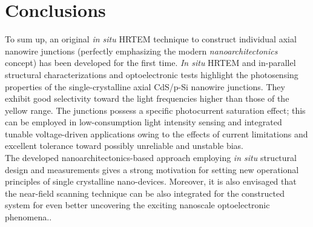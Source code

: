 \section{Conclusions}
To sum up, an original {\em in situ} HRTEM technique to construct individual axial nanowire junctions (perfectly emphasizing the modern {\em nanoarchitectonics} concept) has been developed for the first time. 
{\em In situ} HRTEM and in-parallel structural characterizations and optoelectronic tests highlight the photosensing properties of the single-crystalline axial CdS/p-Si nanowire junctions. They exhibit good selectivity toward the light frequencies higher than those of the yellow range. The junctions possess a specific photocurrent saturation effect; this can be employed in low-consumption light intensity sensing and integrated tunable voltage-driven applications owing to the effects of current limitations and excellent tolerance toward possibly unreliable and unstable bias. \\
The developed nanoarchitectonics-based approach employing \textit{in situ} structural design and measurements gives a strong motivation for setting new operational principles of single crystalline nano-devices. 
Moreover, it is also envisaged that the near-field scanning technique can be also integrated for the constructed system for even better uncovering the exciting nanoscale optoelectronic phenomena.\cite{Gu2005,Xiang2012}.



